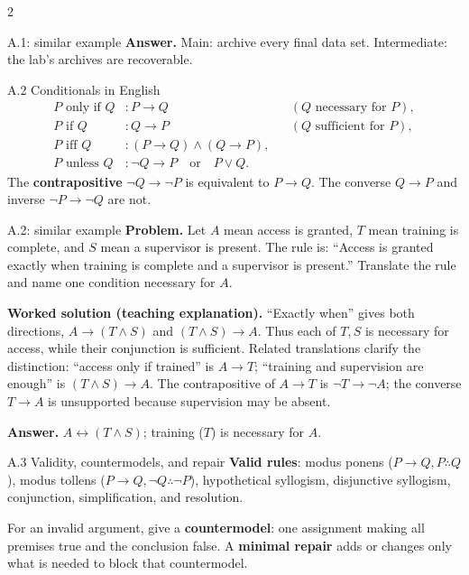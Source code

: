 \documentclass[10pt]{extarticle}
\newcommand{\term}[1]{\textbf{\color{ArgNavy}#1}}
\begin{document}
\begin{multicols}{2}
\begin{workedbox}{A.1: similar example}
\textbf{Answer.} Main: archive every final data set. Intermediate: the lab's archives are recoverable.
\end{workedbox}

\begin{definitionbox}{A.2 Conditionals in English}
\begin{align*}
P\text{ only if }Q&: P\to Q &&(Q\text{ necessary for }P),\\
P\text{ if }Q&: Q\to P &&(Q\text{ sufficient for }P),\\
P\text{ iff }Q&: (P\to Q)\land(Q\to P),\\
P\text{ unless }Q&: \neg Q\to P\quad\text{or}\quad P\lor Q.
\end{align*}
The \term{contrapositive} $\neg Q\to\neg P$ is equivalent to $P\to Q$.
The converse $Q\to P$ and inverse $\neg P\to\neg Q$ are not.
\end{definitionbox}


\begin{workedbox}{A.2: similar example}
\textbf{Problem.} Let $A$ mean access is granted, $T$ mean training is complete, and $S$ mean a supervisor is present. The rule is: ``Access is granted exactly when training is complete and a supervisor is present.'' Translate the rule and name one condition necessary for $A$.

\textbf{Worked solution (teaching explanation).} ``Exactly when'' gives both directions, $A\to(T\land S)$ and $(T\land S)\to A$. Thus each of $T,S$ is necessary for access, while their conjunction is sufficient. Related translations clarify the distinction: ``access only if trained'' is $A\to T$; ``training and supervision are enough'' is $(T\land S)\to A$. The contrapositive of $A\to T$ is $\neg T\to\neg A$; the converse $T\to A$ is unsupported because supervision may be absent.

\textbf{Answer.} $A\leftrightarrow(T\land S)$; training ($T$) is necessary for $A$.
\end{workedbox}

\begin{methodbox}{A.3 Validity, countermodels, and repair}
\term{Valid rules}: modus ponens ($P\to Q,P\therefore Q$), modus tollens
($P\to Q,\neg Q\therefore\neg P$), hypothetical syllogism, disjunctive
syllogism, conjunction, simplification, and resolution.

For an invalid argument, give a \term{countermodel}: one assignment making all
premises true and the conclusion false. A \term{minimal repair} adds or changes
only what is needed to block that countermodel.
\end{methodbox}


\end{multicols}
\end{document}
